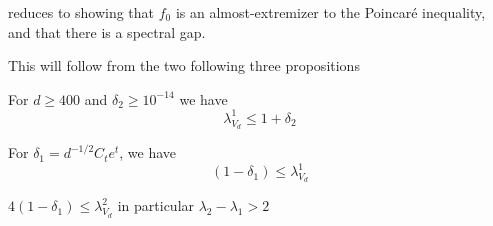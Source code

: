  reduces  to showing that $f_0$ is an almost-extremizer to the Poincaré inequality, and that there is a spectral gap. 

This will follow from the two following three propositions 

\begin{proposition} \label{prop:eig_upper_bound}
For \( d \ge 400 \) and \( \delta_2 \ge 10^{-14} \) we have 
$$
\lambda^{1}_{V_d} \le 1+\delta_2
$$
\end{proposition}

\begin{proposition} \label{prop:eig_lower_bound}
For $\delta_1 = d^{-1/2} C_t e^t$, we have
    \begin{equation*}
        (1-\delta_1) \le \lambda^{1}_{V_d}
    \end{equation*}
\end{proposition}

\begin{proposition} \label{prop:gap_bound}
$4(1-\delta_1) \le \lambda^{2}_{V_d}$ in particular $\lambda_2 - \lambda_1 > 2$
\end{proposition}

